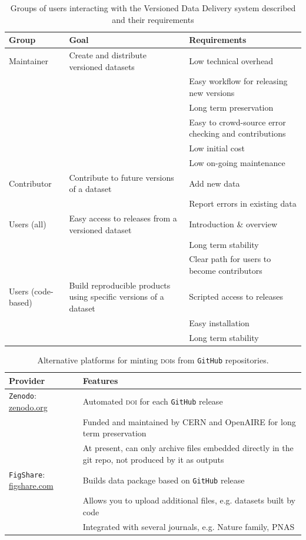 \documentclass[a4paper,11pt]{article}
\newcommand{\smurl}[1]{{\footnotesize\url{#1}}}
\begin{document}
\begin{table}[h!]
\centering
\caption{Groups of users interacting with the Versioned Data Delivery system described and their requirements}
{\footnotesize
\vspace{1cm}
  \begin{tabular}{p{2cm}p{5cm}p{7cm}}
  \hline
  \textbf{Group} & \textbf{Goal} & \textbf{Requirements} \\ \hline
  Maintainer & Create and distribute versioned datasets & Low technical overhead \\
    & & Easy workflow for releasing new versions \\
    & & Long term preservation \\
    & & Easy to crowd-source error checking and contributions \\
    & & Low initial cost \\
    & & Low on-going maintenance \\
  Contributor & Contribute to future versions of a dataset & Add new data \\
    & & Report errors in existing data  \\
  Users (all) & Easy access to releases from a versioned dataset & Introduction \& overview \\
    & & Long term stability \\
    & & Clear path for users to become contributors \\
  Users (code-based) & Build reproducible products using specific versions of a dataset & Scripted access to releases\\
    & & Easy installation\\
    & & Long term stability \\
  \hline
  \end{tabular}
  }
\label{tab:user_requirements}
\end{table}

\newpage


\begin{table}[h!]
\centering
\caption{Alternative platforms for minting \textsc{doi}s from \texttt{GitHub} repositories.}
{\footnotesize
\vspace{1cm}
  \begin{tabular}{p{4cm}p{8cm}}
  \hline
  \textbf{Provider} & \textbf{Features} \\ \hline
  \texttt{Zenodo}: \smurl{zenodo.org} & Automated \textsc{doi} for each \texttt{GitHub} release \\
    & Funded and maintained by CERN and OpenAIRE for long term preservation \\
    & At present, can only archive files embedded directly in the git repo, not produced by it as outputs\\
  \texttt{FigShare}: \smurl{figshare.com} & Builds data package based on \texttt{GitHub} release \\
    & Allows you to upload additional files, e.g. datasets built by code \\
    & Integrated with several journals, e.g. Nature family, \textsc{PNAS} \\
  \hline
  \end{tabular}
  }
\label{tab:doi_minting}
\end{table}
\end{document}
